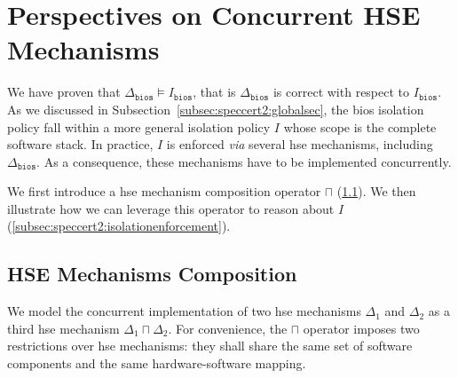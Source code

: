 \section{Perspectives on Concurrent HSE Mechanisms}
\label{subsec:speccert2:coop}

We have proven that \( \Delta_{\mathtt{bios}} \models I_{\mathtt{bios}} \), that
is \( \Delta_{\mathtt{bios}} \) is correct with respect to
\( I_{\mathtt{bios}} \).
%
As we discussed in Subsection~\ref{subsec:speccert2:globalsec}, the \ac{bios}
isolation policy fall within a more general isolation policy \( I \) whose scope
is the complete software stack. 
%
In practice, \( I \) is enforced \emph{via} several \ac{hse} mechanisms,
including \( \Delta_{\mathtt{bios}} \).
%
As a consequence, these mechanisms have to be implemented concurrently.

We first introduce a \ac{hse} mechanism composition operator \( \sqcap \)
(\ref{subsec:speccert2:compo}).
%
We then illustrate how we can leverage this operator to reason about \( I \)
(\ref{subsec:speccert2:isolationenforcement}).
%

\subsection{HSE Mechanisms Composition}
\label{subsec:speccert2:compo}

We model the concurrent implementation of two \ac{hse} mechanisms \( \Delta_1 \)
and \( \Delta_2 \) as a third \ac{hse} mechanism \( \Delta_1 \sqcap \Delta_2 \).
%
For convenience, the \( \sqcap \) operator imposes two restrictions over
\ac{hse} mechanisms: they shall share the same set of software components and
the same hardware-software mapping.

